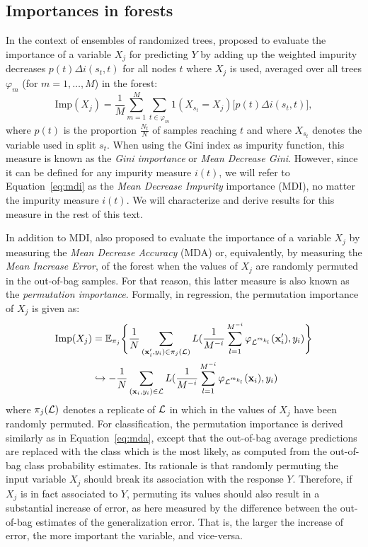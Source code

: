\subsection{Importances in forests}

In the context of ensembles of randomized trees,
\cite{breiman:2001,breiman:2002} proposed to evaluate the importance of
a variable $X_j$  for predicting  $Y$ by adding up the weighted impurity decreases $p(t) \Delta
i(s_t, t)$ for all nodes $t$ where $X_j$ is used, averaged over all trees $\varphi_m$ (for $m=1,\dots,M$)
in the forest:
\begin{equation}\label{eq:mdi}
\text{Imp}(X_j) = \frac{1}{M} \sum_{m=1}^M \sum_{t \in \varphi_{m}} 1(X_{s_t} = X_j) \Big[ p(t) \Delta i(s_t, t) \Big],
\end{equation}
where $p(t)$ is the proportion $\tfrac{N_t}{N}$ of samples
reaching $t$ and where $X_{s_t}$ denotes the variable used in split $s_t$. When
using the Gini index as impurity function, this measure is known as the
\textit{Gini importance} or \textit{Mean Decrease Gini}. However, since it can
be defined for any impurity measure $i(t)$, we will refer to Equation~\ref{eq:mdi}
as the \textit{Mean Decrease Impurity} importance (MDI), no matter the impurity
measure $i(t)$. We will characterize and derive results for this measure in the
rest of this text.

In addition to MDI, \cite{breiman:2001,breiman:2002} also proposed to evaluate
the importance of a variable $X_j$ by measuring the \textit{Mean Decrease
Accuracy} (MDA) or, equivalently, by measuring the \textit{Mean Increase Error},
of the forest when the values of $X_j$ are randomly permuted in the out-of-bag
samples. For that reason, this latter measure is also known as the
\textit{permutation importance}. Formally, in regression, the permutation
importance of $X_j$ is given as:
\begin{align}\label{eq:mda}
\text{Imp}(X_j) &=  \mathbb{E}_{\pi_j} \Bigg\{ \frac{1}{N} \sum_{(\mathbf{x}_i^\prime,y_i) \in \pi_j({\cal L})} L(\frac{1}{M^{-i}} \sum_{l=1}^{M^{-i}} \varphi_{{\cal L}^{m_{k_l}}}(\mathbf{x}_i^\prime), y_i) \Bigg\} \nonumber  \\
&\hookrightarrow - \frac{1}{N} \sum_{(\mathbf{x}_i,y_i) \in {\cal L}} L(\frac{1}{M^{-i}} \sum_{l=1}^{M^{-i}} \varphi_{{\cal L}^{m_{k_l}}}(\mathbf{x}_i), y_i)
\end{align}
where $\pi_j({\cal L})$ denotes a replicate of ${\cal L}$ in which in the
values of $X_j$ have been randomly permuted. For classification, the
permutation importance is derived similarly as in Equation~\ref{eq:mda},
except  that the out-of-bag average predictions are
replaced with the class which is the most likely, as computed from the out-of-bag
class probability estimates. Its rationale is that randomly permuting the
input variable $X_j$ should break its association with the response $Y$. Therefore,
if $X_j$ is in fact associated to $Y$, permuting its values should also result
in a substantial increase of error, as here measured by the difference between
the out-of-bag estimates of the generalization error. That is, the larger
the increase of error, the more important the variable, and vice-versa.

